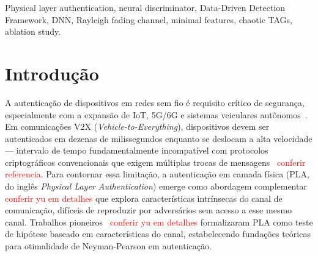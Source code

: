 \documentclass{sbrt}
\newcommand{\rred}[1]{\textcolor{red}{#1}}
\begin{document}
\begin{abstract}
This work proposes an optimal neural network-based discriminator for physical layer authentication with chaotic TAGs in Rayleigh fading channels, achieving detection probability more than 10 times superior to the classical method for signal-to-noise ratios below 5 dB. The method requires only two scalars per received packet (matched correlator and estimated channel gain), maintaining computational simplicity. An ablation study validates that this feature set is minimal and sufficient: any additional information degrades performance, confirming that the neural network captures the essential discriminatory information. We perform statistical validation to ensure that data satisfy independence and identical distribution assumptions, enabling application of the \textit{Data-Driven Detection Framework} (D3F) --- a method that constructs optimal detectors from data with theoretical guarantee of reliable performance using fewer simulations. Comparisons with linear SVM show that the gain stems from dynamic threshold adaptation by the neural network. Results establish a baseline in Rayleigh channels, with extension planned for V2X channels.
\end{abstract}

\begin{keywords}
Physical layer authentication, neural discriminator, Data-Driven Detection Framework, DNN, Rayleigh fading channel, minimal features, chaotic TAGs, ablation study.
\end{keywords}

\section{Introdução}

A autenticação de dispositivos em redes sem fio é requisito crítico de segurança, especialmente com a expansão de IoT, 5G/6G e sistemas veiculares autônomos~\cite{ref_xie}. Em comunicações V2X (\textit{Vehicle-to-Everything}), dispositivos devem ser autenticados em dezenas de milissegundos enquanto se deslocam a alta velocidade --- intervalo de tempo fundamentalmente incompatível com protocolos criptográficos convencionais que exigem múltiplas trocas de mensagens~\cite{ref_v2x_latency} \rred{conferir referencia}. Para contornar essa limitação, a autenticação em camada física (PLA, do inglês \textit{Physical Layer Authentication}) emerge como abordagem complementar~\cite{ref_poor, ref_yu} \rred{conferir yu em detalhes} que explora características intrínsecas do canal de comunicação, difíceis de reproduzir por adversários sem acesso a esse mesmo canal. Trabalhos pioneiros~\cite{ref_yu} \rred{conferir yu em detalhes}  formalizaram PLA como teste de hipótese baseado em características do canal, estabelecendo fundações teóricas para otimalidade de Neyman-Pearson em autenticação.
\end{document}
